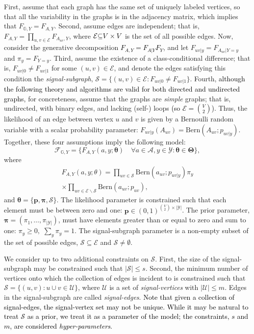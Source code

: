 \documentclass[10pt,journal,cspaper,compsoc]{IEEEtran}
\providecommand{\tk}[1]{\textcolor{black}{#1}}
\providecommand{\ve}[1]{\boldsymbol{#1}}
\newcommand{\GG}{\mathbb{G}}
\newcommand{\bth}{\ve{\theta}}
\newcommand{\bTh}{\ve{\Theta}}
\providecommand{\mc}[1]{\mathcal{#1}}
\providecommand{\mb}[1]{\boldsymbol{#1}}
\begin{document}
First,  assume that each graph has the same set of uniquely labeled vertices, so that all the variability in the graphs is in the adjacency matrix, which implies that $F_{\GG,Y}=F_{A,Y}$. Second, assume edges are independent; that is, $F_{A,Y}=\prod_{u,v \in \mc{E}} F_{A_{uv},Y}$, where 
$\mc{E} \tk{\subseteq} V \times V$ is the set of all possible edges.  Now, consider the generative decomposition \tk{$F_{A,Y}=F_{A|Y} F_Y$}, and let $F_{uv|y}=F_{A_{uv} | Y=y}$ and $\pi_y=F_{Y=y}$.  Third, assume the existence of a class-conditional difference; that is, $F_{uv|0} \neq F_{uv|1}$ for some $(u,v) \in \mc{E}$, and denote the edges satisfying this condition  the \emph{signal-subgraph}, $\mc{S}=\{(u,v) \in \mc{E}: F_{uv|0} \neq F_{uv|1}\}$.  Fourth, \tk{although the following theory and algorithms are valid for both directed and undirected graphs,} for concreteness, assume that the graphs are \emph{simple} graphs; that is, undirected, with binary edges, and lacking (self-) loops \tk{(so $\mc{E}=\binom{V}{2}$)}.  Thus, the likelihood of an edge between vertex $u$ and $v$ is given by a Bernoulli random variable with a scalar probability parameter:  $F_{uv|y}(A_{uv})=\text{Bern}(A_{uv}; p_{uv|y})$. Together, these four assumptions imply the following model: 
\begin{equation}
\mc{F}_{\GG,Y}=\{F_{A, Y}(a,y; \bth) \quad \forall a\in\mc{A},y\in\mc{Y}: \bth \in \bTh\},
\end{equation} 
where
\begin{multline} \label{eq:model}
F_{A,Y}(a,y; \theta) =  \prod_{uv \in \mc{S}} \text{Bern}(a_{uv}; p_{uv|y})  \pi_y 
\\ \times \prod_{uv \in \mc{E} \backslash \mc{S}} \text{Bern}(a_{uv}; p_{uv}),
\end{multline}
and $\bth=\{\mb{p},\mb{\pi},\mc{S}\}$. The likelihood parameter is constrained such that each element must be between zero and one: $\mb{p}\in (0,1)^{\binom{V}{2} \times |\mc{Y}|}$.  The prior parameter, $\mb{\pi}=(\pi_1, \ldots, \pi_{|\mc{Y}|})$, must have elements greater than or equal to zero and sum to one: $\pi_y \geq 0,$ $\sum_y \pi_y=1$.  The signal-subgraph parameter is a non-empty subset of the set of possible edges, $\mc{S} \subseteq \mc{E}$ and $\mc{S} \neq \emptyset$.

We consider up to two additional constraints on $\mc{S}$.  First, the size of the signal-subgraph may be constrained such that $|\mc{S}| \leq s$. Second, the minimum number of vertices onto which the collection of edges is incident to is constrained such that $\mc{S}=\{(u,v): u \cup v \in \mc{U}\}$, where $\mc{U}$ is a set of \emph{signal-vertices} with $|\mc{U}|\leq m$. 
Edges in the signal-subgraph are called \emph{signal-edges}. \tk{Note that given a collection of signal-edges, the signal-vertex set may not be unique.  While it may be natural to treat $\mc{S}$ as a prior, we treat it as a parameter of the model; the constraints, $s$ and $m$, are considered \emph{hyper-parameters}.}
\end{document}

